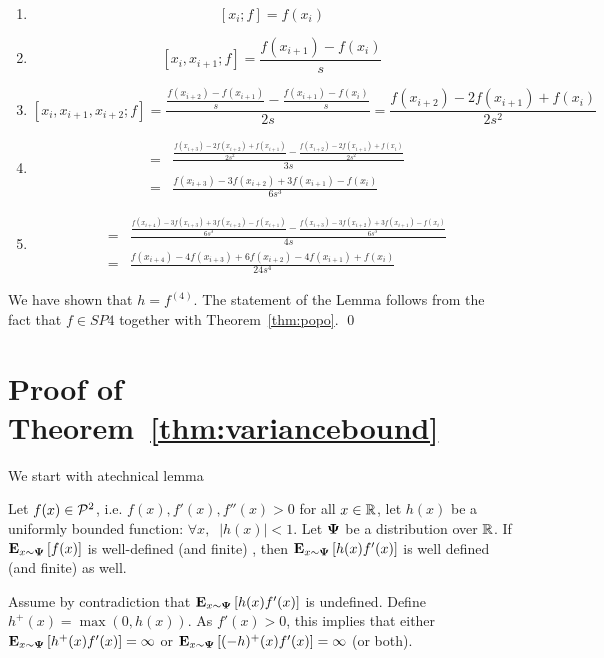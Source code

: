 \documentclass{article}[12pt]
\begin{document}
\begin{enumerate}
\item
$$[x_i;f] = f(x_i)$$
\item
  $$[x_i,x_{i+1};f]=\frac{f(x_{i+1})-f(x_i)}{s}$$
\item
  $$[x_i,x_{i+1},x_{i+2};f] =
  \frac{\frac{f(x_{i+2})-f(x_{i+1})}{s}-\frac{f(x_{i+1})-f(x_i)}{s}}{2s}
  =\frac{f(x_{i+2})-2f(x_{i+1})+f(x_i)}{2 s^2}
  $$
\item
  \begin{eqnarray*}
    [x_i,x_{i+1},x_{i+2},x_{i+3};f]& = &
    \frac{\frac{f(x_{i+3})-2f(x_{i+2})+f(x_{i+1})}{2
    s^2}-\frac{f(x_{i+2})-2f(x_{i+1})+f(x_i)}{2
    s^2}}{3s}\\
    &=& \frac{f(x_{i+3}) -3f(x_{i+2})+3f(x_{i+1})-f(x_i)   }{6 s^3}
  \end{eqnarray*}
\item
  \begin{eqnarray*}
    [x_i,x_{i+1},x_{i+2},x_{i+3},x_{i+4};f]& = &
    \frac{\frac{f(x_{i+4}) -3f(x_{i+3})+3f(x_{i+2})-f(x_{i+1})   }{6 s^3}
    - \frac{f(x_{i+3}) -3f(x_{i+2})+3f(x_{i+1})-f(x_i)   }{6 s^3}}
    {4s}\\
    &=& \frac{f(x_{i+4})-4f(x_{i+3})+6f(x_{i+2})-4f(x_{i+1})+f(x_i)}{24s^4}
  \end{eqnarray*}
\end{enumerate}
We have shown that $h=f^{(4)}$. The statement of the Lemma follows from the fact that $f \in SP{4}$ together with Theorem~\ref{thm:popo}.
\qed
  
\section{Proof of Theorem~\ref{thm:variancebound}}
\label{appendix:ProofOfVarianceBound}
We start with atechnical lemma
\begin{lemma} \label{lemma:infiniteexpectations}
Let $f(x) \in {\cal P}^{2}$, i.e. $f(x), f'(x),f''(x) >0$ for all $x \in
\mathbb{R}$, let $h(x)$ be a uniformly bounded function: $\forall x,\;\; |h(x)|<1$.
Let ${\bf \Psi}$ be a distribution over $\mathbb{R}$.
If ${\bf E}_{x \sim {\bf \Psi}}\left[ f(x) \right]$ is well-defined (and finite) , then 
${\bf E}_{x \sim {\bf \Psi}}\left[ h(x) f'(x) \right]$ is well defined (and finite) as well.
\end{lemma}
\proof
Assume by contradiction that ${\bf E}_{x \sim {\bf \Psi}}\left[ h(x) f'(x) \right]$ is
undefined. Define $h^+(x) = \max(0,h(x))$.
As $f'(x)>0$, this implies that either ${\bf E}_{x \sim {\bf \Psi}}\left[ h^+(x)
  f'(x) \right]=\infty$ or ${\bf E}_{x \sim {\bf \Psi}}\left[ (-h)^+(x) f'(x) \right]=\infty$ (or both). 
\end{document}

